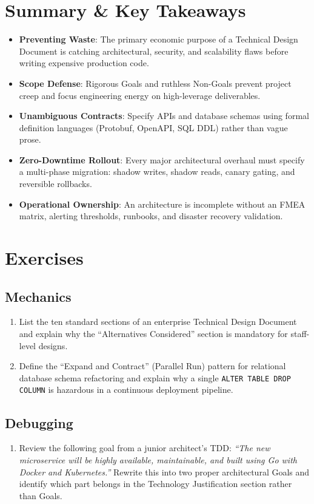 \section{Summary \protect\& Key Takeaways}

\begin{itemize}[leftmargin=18pt]
  \item \textbf{Preventing Waste}: The primary economic purpose of a Technical Design Document is catching architectural, security, and scalability flaws before writing expensive production code.
  \item \textbf{Scope Defense}: Rigorous Goals and ruthless Non-Goals prevent project creep and focus engineering energy on high-leverage deliverables.
  \item \textbf{Unambiguous Contracts}: Specify APIs and database schemas using formal definition languages (Protobuf, OpenAPI, SQL DDL) rather than vague prose.
  \item \textbf{Zero-Downtime Rollout}: Every major architectural overhaul must specify a multi-phase migration: shadow writes, shadow reads, canary gating, and reversible rollbacks.
  \item \textbf{Operational Ownership}: An architecture is incomplete without an FMEA matrix, alerting thresholds, runbooks, and disaster recovery validation.
\end{itemize}

\section{Exercises}

\subsection*{Mechanics}
\begin{enumerate}[leftmargin=18pt]
  \item List the ten standard sections of an enterprise Technical Design Document and explain why the ``Alternatives Considered'' section is mandatory for staff-level designs.
  \item Define the ``Expand and Contract'' (Parallel Run) pattern for relational database schema refactoring and explain why a single \texttt{ALTER TABLE DROP COLUMN} is hazardous in a continuous deployment pipeline.
\end{enumerate}

\subsection*{Debugging}
\begin{enumerate}[leftmargin=18pt]
  \item Review the following goal from a junior architect's TDD: \textit{``The new microservice will be highly available, maintainable, and built using Go with Docker and Kubernetes.''} Rewrite this into two proper architectural Goals and identify which part belongs in the Technology Justification section rather than Goals.
\end{enumerate}

